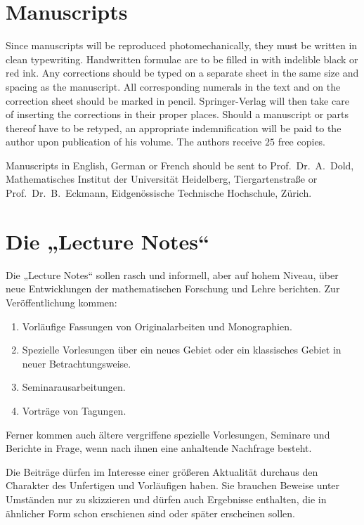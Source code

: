\section*{Manuscripts}
Since manuscripts will be reproduced photomechanically, they must be written in clean typewriting. Handwritten formulae are to be filled in with indelible black or red ink. Any corrections should be typed on a separate sheet in the same size and spacing as the manuscript. All corresponding numerals in the text and on the correction sheet should be marked in pencil. Springer-Verlag will then take care of inserting the corrections in their proper places. Should a manuscript or parts thereof have to be retyped, an appropriate indemnification will be paid to the author upon publication of his volume. The authors receive $25$ free copies.

\medskip
Manuscripts in English, German or French should be sent to Prof.\ Dr.\ A.\ Dold, Mathematisches Institut der Universit\"at Heidelberg, Tiergartenstra\ss{}e or Prof.\ Dr.\ B.\ Eckmann, Eidgen\"ossische Technische Hochschule, Z\"urich.

\section*{\texorpdfstring{Die „Lecture Notes“}{Die Lecture Notes}}
Die „Lecture Notes“ sollen rasch und informell, aber auf hohem Niveau, \"uber neue Entwicklungen der mathematischen Forschung und Lehre berichten. Zur Ver\"offentlichung kommen:
\begin{enumerate}[leftmargin=2.5em]
\item Vorl\"aufige Fassungen von Originalarbeiten und Monographien.
\item Spezielle Vorlesungen \"uber ein neues Gebiet oder ein klassisches Gebiet in neuer Betrachtungsweise.
\item Seminarausarbeitungen.
\item Vortr\"age von Tagungen.
\end{enumerate}
Ferner kommen auch \"altere vergriffene spezielle Vorlesungen, Seminare und Berichte in Frage, wenn nach ihnen eine anhaltende Nachfrage besteht.

\medskip
Die Beitr\"age d\"urfen im Interesse einer gr\"o\ss{}eren Aktualit\"at durchaus den Charakter des Unfertigen und Vorl\"aufigen haben. Sie brauchen Beweise unter Umst\"anden nur zu skizzieren und d\"urfen auch Ergebnisse enthalten, die in \"ahnlicher Form schon erschienen sind oder sp\"ater erscheinen sollen.

